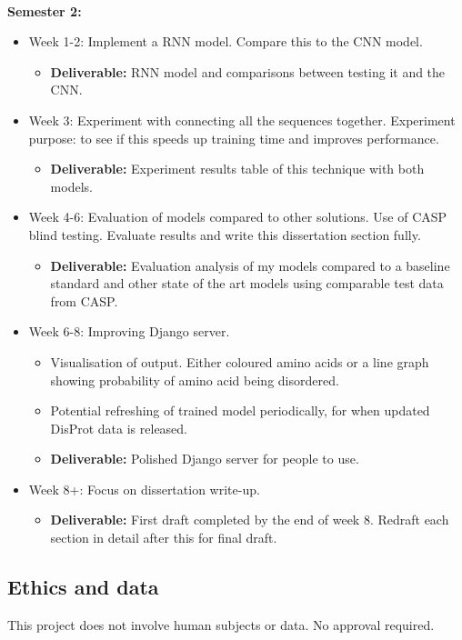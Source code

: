 \documentclass[11pt]{article}
\begin{document}
\noindent
\\ \textbf{Semester 2:}
\begin{itemize}
    \item{Week 1-2: Implement a RNN model. Compare this to the CNN model.}
    \begin{itemize}
        \item {\textbf{Deliverable:} RNN model and comparisons between testing it and the CNN.}
    \end{itemize}
    \item{Week 3: Experiment with connecting all the sequences together. Experiment purpose: to see if this speeds up training time and improves performance.}
    \begin{itemize}
        \item {\textbf{Deliverable:} Experiment results table of this technique with both models.}
    \end{itemize}
    \item{Week 4-6: Evaluation of models compared to other solutions. Use of CASP blind testing. Evaluate results and write this dissertation section fully.}
    \begin{itemize}
        \item {\textbf{Deliverable:}  Evaluation analysis of my models compared to a baseline standard and other state of the art models using comparable test data from CASP.}
    \end{itemize}
    \item{Week 6-8: Improving Django server.}
    \begin{itemize}
        \item{Visualisation of output. Either coloured amino acids or a line graph showing probability of amino acid being disordered.}
        \item{Potential refreshing of trained model periodically, for when updated DisProt data is released.}
    \end{itemize}
    \begin{itemize}
        \item {\textbf{Deliverable:} Polished Django server for people to use.}
    \end{itemize}
    \item{Week 8+: Focus on dissertation write-up.}
    \begin{itemize}
        \item {\textbf{Deliverable:} First draft completed by the end of week 8. Redraft each section in detail after this for final draft.}
    \end{itemize}
\end{itemize}

\subsection{Ethics and data}\label{ethics}
This project does not involve human subjects or data. No approval required.
\end{document}
